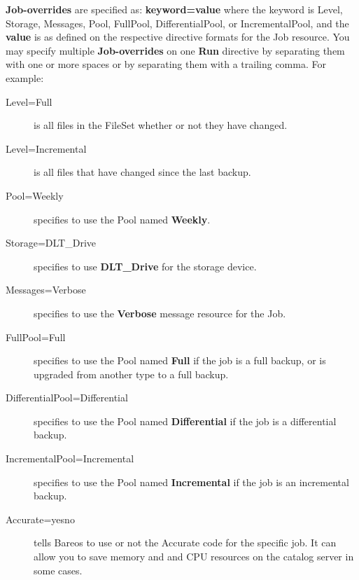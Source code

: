 \begin{description}
{\bf Job-overrides} are specified as: {\bf keyword=value} where the
keyword is Level, Storage, Messages, Pool, FullPool, DifferentialPool,
or IncrementalPool, and the {\bf value} is as defined on the respective
directive formats for the Job resource.  You may specify multiple {\bf
Job-overrides} on one {\bf Run} directive by separating them with one or
more spaces or by separating them with a trailing comma.  For example:

\begin{description}

\item [Level=Full]
is all files in the FileSet whether or not  they have changed.

\item [Level=Incremental]
is all files that have changed since  the last backup.

\item [Pool=Weekly]
specifies to use the Pool named {\bf Weekly}.

\item [Storage=DLT\_Drive]
specifies to use {\bf DLT\_Drive} for  the storage device.

\item [Messages=Verbose]
specifies to use the {\bf Verbose}  message resource for the Job.

\item [FullPool=Full]
specifies to use the Pool named {\bf Full}  if the job is a full backup, or
is upgraded from another type  to a full backup.

\item [DifferentialPool=Differential]
specifies to use the Pool named {\bf Differential} if the job is a
differential  backup.

\item [IncrementalPool=Incremental]
specifies to use the Pool  named {\bf Incremental} if the job is an
incremental  backup.

\item [Accurate=yes{\textbar}no]
tells Bareos to use or not the Accurate code for the specific job. It can
allow you to save memory and and CPU resources on the catalog server in some
cases.


\end{description}
\end{description}
